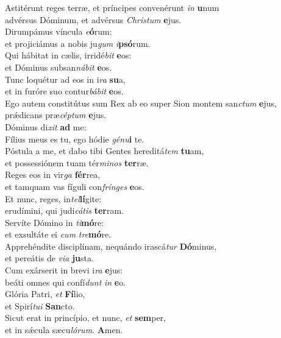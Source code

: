 \evenverse Astitérunt reges terræ, et príncipes convenérunt \textit{in} \textbf{u}num~\*\\
\evenverse advérsus Dóminum, et advérsus \textit{Chri}\textit{stum} \textbf{e}jus.\\
\oddverse Dirumpámus víncula \textit{e}\textbf{ó}rum:~\*\\
\oddverse et projiciámus a nobis ju\textit{gum} \textit{i}\textbf{psó}rum.\\
\evenverse Qui hábitat in cælis, irridé\textit{bit} \textbf{e}os:~\*\\
\evenverse et Dóminus subsan\textit{ná}\textit{bit} \textbf{e}os.\\
\oddverse Tunc loquétur ad eos in i\textit{ra} \textbf{su}a,~\*\\
\oddverse et in furóre suo contur\textit{bá}\textit{bit} \textbf{e}os.\\
\evenverse Ego autem constitútus sum Rex ab eo super Sion montem san\textit{ctum} \textbf{e}jus,~\*\\
\evenverse prǽdicans præ\textit{cép}\textit{tum} \textbf{e}jus.\\
\oddverse Dóminus di\textit{xit} \textbf{ad} me:~\*\\
\oddverse Fílius meus es tu, ego hódie \textit{gé}\textit{nu}\textbf{i} te.\\
\evenverse Póstula a me, et dabo tibi Gentes hereditá\textit{tem} \textbf{tu}am,~\*\\
\evenverse et possessiónem tuam tér\textit{mi}\textit{nos} \textbf{ter}ræ.\\
\oddverse Reges eos in vir\textit{ga} \textbf{fér}rea,~\*\\
\oddverse et tamquam vas fíguli con\textit{frín}\textit{ges} \textbf{e}os.\\
\evenverse Et nunc, reges, in\textit{tel}\textbf{lí}gite:~\*\\
\evenverse erudímini, qui judi\textit{cá}\textit{tis} \textbf{ter}ram.\\
\oddverse Servíte Dómino in \textit{ti}\textbf{mó}re:~\*\\
\oddverse et exsultáte ei \textit{cum} \textit{tre}\textbf{mó}re.\\
\evenverse Apprehéndite disciplínam, nequándo irascá\textit{tur} \textbf{Dó}minus,~\*\\
\evenverse et pereátis de \textit{vi}\textit{a} \textbf{ju}sta.\\
\oddverse Cum exárserit in brevi i\textit{ra} \textbf{e}jus:~\*\\
\oddverse beáti omnes qui confí\textit{dunt} \textit{in} \textbf{e}o.\\
\evenverse Glória Patri, \textit{et} \textbf{Fí}lio,~\*\\
\evenverse et Spirí\textit{tu}\textit{i} \textbf{San}cto.\\
\oddverse Sicut erat in princípio, et nunc, \textit{et} \textbf{sem}per,~\*\\
\oddverse et in sǽcula sæcu\textit{ló}\textit{rum}. \textbf{A}men.\\
